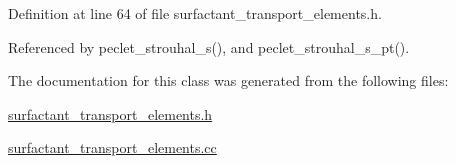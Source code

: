 Definition at line 64 of file surfactant\+\_\+transport\+\_\+elements.\+h.



Referenced by peclet\+\_\+strouhal\+\_\+s(), and peclet\+\_\+strouhal\+\_\+s\+\_\+pt().



The documentation for this class was generated from the following files\+:\begin{DoxyCompactItemize}
\item 
\hyperlink{surfactant__transport__elements_8h}{surfactant\+\_\+transport\+\_\+elements.\+h}\item 
\hyperlink{surfactant__transport__elements_8cc}{surfactant\+\_\+transport\+\_\+elements.\+cc}\end{DoxyCompactItemize}
